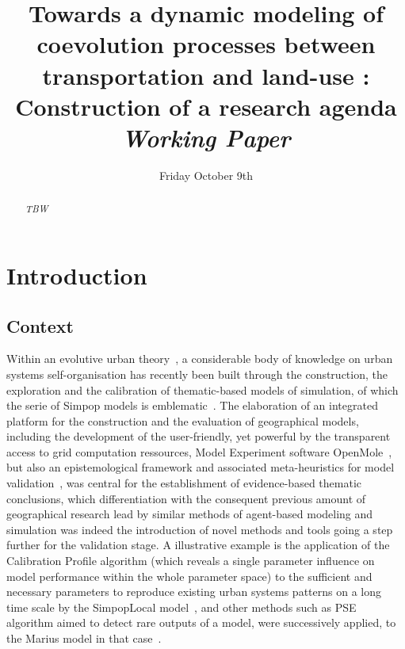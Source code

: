


\title{Towards a dynamic modeling of coevolution processes between transportation and land-use : Construction of a research agenda\bigskip\\
\textit{Working Paper}
}
\author{}
\date{Friday October 9th}


\maketitle

\justify


\begin{abstract}
\textit{TBW}
\end{abstract}


\section{Introduction}


\subsection{Context}






Within an evolutive urban theory~\cite{pumain2006evolutionary}, a considerable body of knowledge on urban systems self-organisation has recently been built through the construction, the exploration and the calibration of thematic-based models of simulation, of which the serie of Simpop models is emblematic~\cite{pumain2012multi}. The elaboration of an integrated platform for the construction and the evaluation of geographical models, including the development of the user-friendly, yet powerful by the transparent access to grid computation ressources, Model Experiment software OpenMole~\cite{reuillon2013openmole}, but also an epistemological framework and associated meta-heuristics for model validation~\cite{rey2015plateforme}, was central for the establishment of evidence-based thematic conclusions, which differentiation with the consequent previous amount of geographical research lead by similar methods of agent-based modeling and simulation was indeed the introduction of novel methods and tools going a step further for the validation stage. A illustrative example is the application of the Calibration Profile algorithm (which reveals a single parameter influence on model performance within the whole parameter space) to the sufficient and necessary parameters to reproduce existing urban systems patterns on a long time scale by the SimpopLocal model~\cite{schmitt2014half}, and other methods such as PSE algorithm aimed to detect rare outputs of a model, were successively applied, to the Marius model in that case~\cite{10.1371/journal.pone.0138212}.

